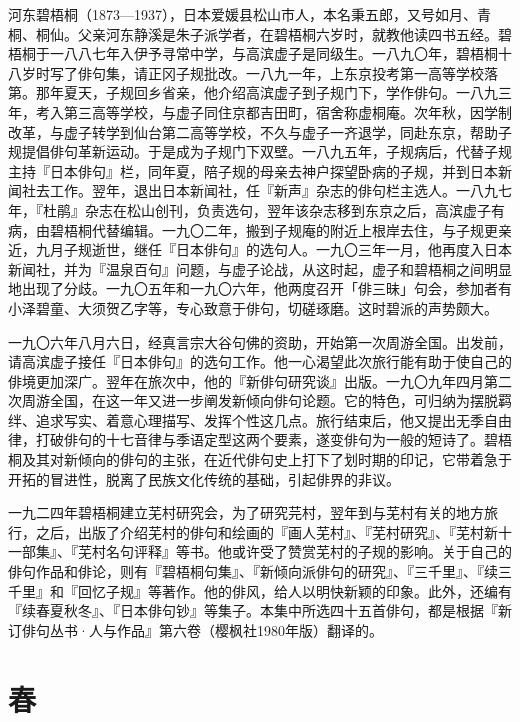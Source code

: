 {\FS
    河东碧梧桐（1873—1937），日本爱媛县松山市人，本名秉五郎，又号如月、青桐、桐仙。父亲河东静溪是朱子派学者，在碧梧桐六岁时，就教他读四书五经。碧梧桐于一八八七年入伊予寻常中学，与高滨虚子是同级生。一八九〇年，碧梧桐十八岁时写了俳句集，请正冈子规批改。一八九一年，上东京投考第一高等学校落第。那年夏天，子规回乡省亲，他介绍高滨虚子到子规门下，学作俳句。一八九三年，考入第三高等学校，与虚子同住京都吉田町，宿舍称虚桐庵。次年秋，因学制改革，与虚子转学到仙台第二高等学校，不久与虚子一齐退学，同赴东京，帮助子规提倡俳句革新运动。于是成为子规门下双壁。一八九五年，子规病后，代替子规主持『日本俳句』栏，同年夏，陪子规的母亲去神户探望卧病的子规，并到日本新闻社去工作。翌年，退出日本新闻社，任『新声』杂志的俳句栏主选人。一八九七年，『杜鹃』杂志在松山创刊，负责选句，翌年该杂志移到东京之后，高滨虚子有病，由碧梧桐代替编辑。一九〇二年，搬到子规庵的附近上根岸去住，与子规更亲近，九月子规逝世，继任『日本俳句』的选句人。一九〇三年一月，他再度入日本新闻社，并为『温泉百句』问题，与虚子论战，从这时起，虚子和碧梧桐之间明显地出现了分歧。一九〇五年和一九〇六年，他两度召开「俳三昧」句会，参加者有小泽碧童、大须贺乙字等，专心致意于俳句，切磋琢磨。这时碧派的声势颇大。

    一九〇六年八月六日，经真言宗大谷句佛的资助，开始第一次周游全国。出发前，请高滨虚子接任『日本俳句』的选句工作。他一心渴望此次旅行能有助于使自己的俳境更加深广。翌年在旅次中，他的『新俳句研究谈』出版。一九〇九年四月第二次周游全国，在这一年又进一步阐发新倾向俳句论题。它的特色，可归纳为摆脱羁绊、追求写实、着意心理描写、发挥个性这几点。旅行结束后，他又提出无季自由律，打破俳句的十七音律与季语定型这两个要素，遂变俳句为一般的短诗了。碧梧桐及其对新倾向的俳句的主张，在近代俳句史上打下了划时期的印记，它带着急于开拓的冒进性，脱离了民族文化传统的基础，引起俳界的非议。

    一九二四年碧梧桐建立芜村研究会，为了研究芫村，翌年到与芜村有关的地方旅行，之后，出版了介绍芜村的俳句和绘画的『画人芜村』、『芜村研究』、『芜村新十一部集』、『芜村名句评释』等书。他或许受了赞赏芜村的子规的影响。关于自己的俳句作品和俳论，则有『碧梧桐句集』、『新倾向派俳句的研究』、『三千里』、『续三千里』和『回忆子规』等著作。他的俳风，给人以明快新颖的印象。此外，还编有『续春夏秋冬』、『日本俳句钞』等集子。本集中所选四十五首俳句，都是根据『新订俳句丛书·人与作品』第六卷（樱枫社1980年版）翻译的。
}

\newpage

\section{\FK 春}

